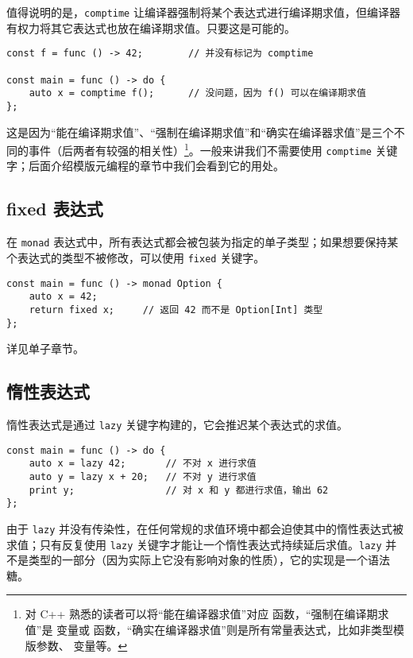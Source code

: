值得说明的是，\lstinline!comptime! 让编译器强制将某个表达式进行编译期求值，但编译器有权力将其它表达式也放在编译期求值。只要这是可能的。

\begin{lstlisting}
const f = func () -> 42;		// 并没有标记为 comptime

const main = func () -> do {
	auto x = comptime f();		// 没问题，因为 f() 可以在编译期求值
};
\end{lstlisting}

这是因为“能在编译期求值”、“强制在编译期求值”和“确实在编译器求值”是三个不同的事件（后两者有较强的相关性）\footnote{对 C++ 熟悉的读者可以将“能在编译器求值”对应  函数，“强制在编译期求值”是  变量或  函数，“确实在编译器求值”则是所有常量表达式，比如非类型模版参数、 变量等。}。一般来讲我们不需要使用 \lstinline!comptime! 关键字；后面介绍模版元编程的章节中我们会看到它的用处。

\subsection{fixed 表达式}

在 \lstinline!monad! 表达式中，所有表达式都会被包装为指定的单子类型；如果想要保持某个表达式的类型不被修改，可以使用 \lstinline!fixed! 关键字。

\begin{lstlisting}
const main = func () -> monad Option {
	auto x = 42;
	return fixed x;		// 返回 42 而不是 Option[Int] 类型
};
\end{lstlisting}

详见单子章节。

\subsection{惰性表达式}

惰性表达式是通过 \lstinline!lazy! 关键字构建的，它会推迟某个表达式的求值。

\begin{lstlisting}
const main = func () -> do {
    auto x = lazy 42;       // 不对 x 进行求值
    auto y = lazy x + 20;   // 不对 y 进行求值
    print y;                // 对 x 和 y 都进行求值，输出 62
};
\end{lstlisting}

由于 \lstinline!lazy! 并没有传染性，在任何常规的求值环境中都会迫使其中的惰性表达式被求值；只有反复使用 \lstinline!lazy! 关键字才能让一个惰性表达式持续延后求值。\lstinline!lazy! 并不是类型的一部分（因为实际上它没有影响对象的性质），它的实现是一个语法糖。

